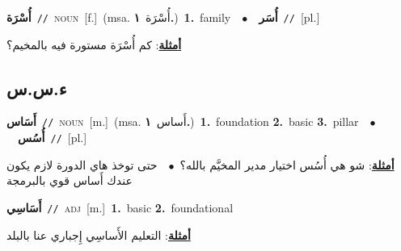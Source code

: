 \documentclass[10pt,a4paper,twoside]{article} %
\begin{document}
\begin{multicols}{2}
{\setlength\topsep{0pt}\textbf{\foreignlanguage{arabic}{أُسْرَة}}\ {\color{gray}\texttt{//}\color{black}}\ \textsc{noun}\ [f.]\ \color{gray}(msa. \foreignlanguage{arabic}{أُسْرَة}~\foreignlanguage{arabic}{\textbf{١.}})\color{black}\ \textbf{1.}~family\ \ $\bullet$\ \ \setlength\topsep{0pt}\textbf{\foreignlanguage{arabic}{أُسَر}}\ {\color{gray}\texttt{//}\color{black}}\ [pl.]\  \begin{flushright}\color{gray}\foreignlanguage{arabic}{\textbf{\underline{\foreignlanguage{arabic}{أمثلة}}}: كم أُسْرَة مستورة فيه بالمخيم؟}\end{flushright}\color{black}} \vspace{2mm}

\vspace{-3mm}
\subsection*{\color{blue}\foreignlanguage{arabic}{ء.س.س}\color{blue}{}} 

{\setlength\topsep{0pt}\textbf{\foreignlanguage{arabic}{أَسَاس}}\ {\color{gray}\texttt{//}\color{black}}\ \textsc{noun}\ [m.]\ \color{gray}(msa. \foreignlanguage{arabic}{أَساس}~\foreignlanguage{arabic}{\textbf{١.}})\color{black}\ \textbf{1.}~foundation  \textbf{2.}~basic  \textbf{3.}~pillar\ \ $\bullet$\ \ \setlength\topsep{0pt}\textbf{\foreignlanguage{arabic}{أُسُس}}\ {\color{gray}\texttt{//}\color{black}}\ [pl.]\  \begin{flushright}\color{gray}\foreignlanguage{arabic}{\textbf{\underline{\foreignlanguage{arabic}{أمثلة}}}: شو هي أُسُس اختيار مدير المخيَّم بالله؟\ $\bullet$\ \  حتى توخذ هاي الدورة لازم يكون عندك أَساس قوي بالبرمجة}\end{flushright}\color{black}} \vspace{2mm}

{\setlength\topsep{0pt}\textbf{\foreignlanguage{arabic}{أَسَاسِي}}\ {\color{gray}\texttt{//}\color{black}}\ \textsc{adj}\ [m.]\ \textbf{1.}~basic  \textbf{2.}~foundational\  \begin{flushright}\color{gray}\foreignlanguage{arabic}{\textbf{\underline{\foreignlanguage{arabic}{أمثلة}}}: التعليم الأَساسِي إِجباري عنا بالبلد}\end{flushright}\color{black}} \vspace{2mm}


\end{multicols}
\end{document}
